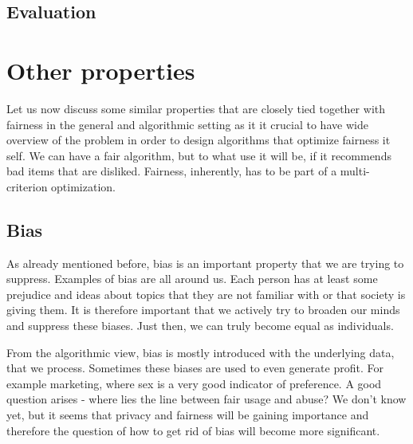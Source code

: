 \subsection{Evaluation} \label{sec:02_evaluation}


\section{Other properties} \label{sec:02_other_properties}
Let us now discuss some similar properties that are closely tied together with fairness in the general and algorithmic setting as it it crucial to have wide overview of the problem in order to design algorithms that optimize fairness it self. We can have a fair algorithm, but to what use it will be, if it recommends bad items that are disliked. Fairness, inherently, has to be part of a multi-criterion optimization.

\subsection{Bias}
As already mentioned before, bias is an important property that we are trying to suppress. Examples of bias are all around us. Each person has at least some prejudice and ideas about topics that they are not familiar with or that society is giving them. It is therefore important that we actively try to broaden our minds and suppress these biases. Just then, we can truly become equal as individuals.

From the algorithmic view, bias is mostly introduced with the underlying data, that we process. Sometimes these biases are used to even generate profit. For example marketing, where sex is a very good indicator of preference. A good question arises - where lies the line between fair usage and abuse? We don't know yet, but it seems that privacy and fairness will be gaining importance and therefore the question of how to get rid of bias will become more significant.



